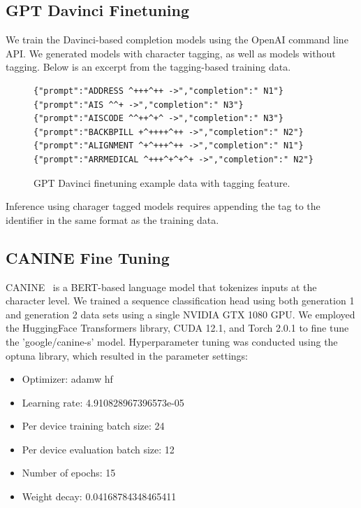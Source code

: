 \subsection{GPT Davinci Finetuning}

We train the Davinci-based completion models using the OpenAI command line API.
We generated models with character tagging, as well as models without tagging.
Below is an excerpt from the tagging-based training data.

\begin{figure}
\begin{Verbatim}[frame=single,fillcolor=\color{lightgray}]
{"prompt":"ADDRESS ^+++^++ ->","completion":" N1"}
{"prompt":"AIS ^^+ ->","completion":" N3"}
{"prompt":"AISCODE ^^++^+^ ->","completion":" N3"}
{"prompt":"BACKBPILL +^++++^++ ->","completion":" N2"}
{"prompt":"ALIGNMENT ^+^+++^++ ->","completion":" N1"}
{"prompt":"ARRMEDICAL ^+++^+^+^+ ->","completion":" N2"}
\end{Verbatim}
\caption{GPT Davinci finetuning example data with tagging feature.}
\end{figure}


Inference using charager tagged models requires appending the tag to the identifier in the same format as the training data.

\subsection{CANINE Fine Tuning}
CANINE~\cite{Clark-2022} is a BERT-based language model that tokenizes inputs at the character level. 
We trained a sequence classification head using both generation 1 and generation 2 data sets using a single NVIDIA GTX 1080 GPU. 
We employed the HuggingFace Transformers library, CUDA 12.1, and Torch 2.0.1 to fine tune the 'google/canine-s' model.
Hyperparameter tuning was conducted using the optuna library, which resulted in the parameter settings:
\begin{itemize}
  \item Optimizer: adamw hf 
  \item Learning rate: 4.910828967396573e-05
  \item Per device training batch size: 24
  \item Per device evaluation batch size: 12
  \item Number of epochs: 15
  \item Weight decay: 0.04168784348465411
\end{itemize}

